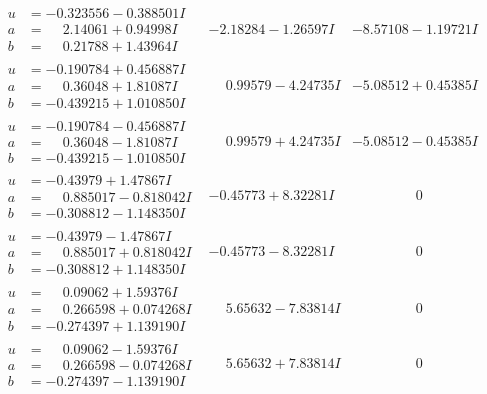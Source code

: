 \documentclass[1p]{elsarticle_modified}
\theoremstyle{definition}
\begin{document}
$$\begin{array}{c|c|c}
\begin{aligned}
u &= -0.323556 - 0.388501 I \\
a &= \phantom{-}2.14061 + 0.94998 I \\
b &= \phantom{-}0.21788 + 1.43964 I\end{aligned}
 & -2.18284 - 1.26597 I & -8.57108 - 1.19721 I \\ \hline\begin{aligned}
u &= -0.190784 + 0.456887 I \\
a &= \phantom{-}0.36048 + 1.81087 I \\
b &= -0.439215 + 1.010850 I\end{aligned}
 & \phantom{-}0.99579 - 4.24735 I & -5.08512 + 0.45385 I \\ \hline\begin{aligned}
u &= -0.190784 - 0.456887 I \\
a &= \phantom{-}0.36048 - 1.81087 I \\
b &= -0.439215 - 1.010850 I\end{aligned}
 & \phantom{-}0.99579 + 4.24735 I & -5.08512 - 0.45385 I \\ \hline\begin{aligned}
u &= -0.43979 + 1.47867 I \\
a &= \phantom{-}0.885017 - 0.818042 I \\
b &= -0.308812 - 1.148350 I\end{aligned}
 & -0.45773 + 8.32281 I & \phantom{-0.000000 } 0 \\ \hline\begin{aligned}
u &= -0.43979 - 1.47867 I \\
a &= \phantom{-}0.885017 + 0.818042 I \\
b &= -0.308812 + 1.148350 I\end{aligned}
 & -0.45773 - 8.32281 I & \phantom{-0.000000 } 0 \\ \hline\begin{aligned}
u &= \phantom{-}0.09062 + 1.59376 I \\
a &= \phantom{-}0.266598 + 0.074268 I \\
b &= -0.274397 + 1.139190 I\end{aligned}
 & \phantom{-}5.65632 - 7.83814 I & \phantom{-0.000000 } 0 \\ \hline\begin{aligned}
u &= \phantom{-}0.09062 - 1.59376 I \\
a &= \phantom{-}0.266598 - 0.074268 I \\
b &= -0.274397 - 1.139190 I\end{aligned}
 & \phantom{-}5.65632 + 7.83814 I & \phantom{-0.000000 } 0 \\ \hline\begin{aligned}

\end{aligned}
\end{array}$$
\end{document}
